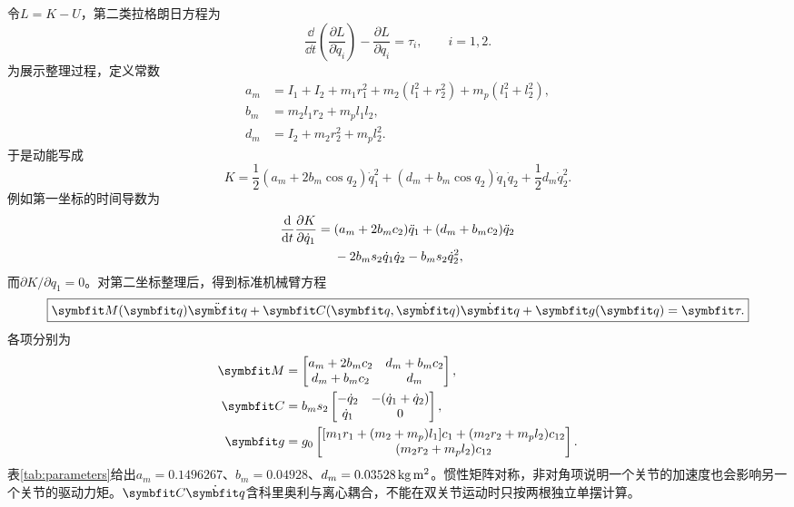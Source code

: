 令$L=K-U$，第二类拉格朗日方程\cite{lynch2017,asada2005}为
\begin{equation}
\frac{\dd}{\dd t}\left(\frac{\partial L}{\partial\dot q_i}\right)
-\frac{\partial L}{\partial q_i}=\tau_i,\qquad i=1,2.
\end{equation}
为展示整理过程，定义常数
\begin{align}
a_m&=I_1+I_2+m_1r_1^2+m_2(l_1^2+r_2^2)+m_p(l_1^2+l_2^2),\\
b_m&=m_2l_1r_2+m_pl_1l_2,\\
d_m&=I_2+m_2r_2^2+m_pl_2^2.
\end{align}
于是动能写成
\begin{equation}
K=\frac12(a_m+2b_m\cos q_2)\dot q_1^2
+(d_m+b_m\cos q_2)\dot q_1\dot q_2+\frac12d_m\dot q_2^2.
\end{equation}
例如第一坐标的时间导数为
\begin{align}
\frac{\mathrm d}{\mathrm d t}\frac{\partial K}{\partial\dot q_1}
={}&(a_m+2b_mc_2)\ddot q_1+(d_m+b_mc_2)\ddot q_2\notag\\
&-2b_ms_2\dot q_1\dot q_2-b_ms_2\dot q_2^2,
\end{align}
而$\partial K/\partial q_1=0$。对第二坐标整理后，得到标准机械臂方程
\begin{equation}
\boxed{\vect M(\vect q)\ddot{\vect q}+\vect C(\vect q,\dot{\vect q})\dot{\vect q}+\vect g(\vect q)=\vect\tau.}
\label{eq:serial_dyn}
\end{equation}
各项分别为
\begin{align}
\vect M&=\begin{bmatrix}a_m+2b_mc_2&d_m+b_mc_2\\d_m+b_mc_2&d_m\end{bmatrix},\label{eq:mass}\\
\vect C&=b_ms_2\begin{bmatrix}-\dot q_2&-(\dot q_1+\dot q_2)\\\dot q_1&0\end{bmatrix},\label{eq:coriolis}\\
\vect g&=g_0\begin{bmatrix}
[m_1r_1+(m_2+m_p)l_1]c_1+(m_2r_2+m_pl_2)c_{12}\\
(m_2r_2+m_pl_2)c_{12}
\end{bmatrix}.
\label{eq:gravity}
\end{align}
表\ref{tab:parameters}给出$a_m=0.1496267$、$b_m=0.04928$、$d_m=0.03528\,\mathrm{kg\,m^2}$。惯性矩阵对称，非对角项说明一个关节的加速度也会影响另一个关节的驱动力矩。$\vect C\dot{\vect q}$含科里奥利与离心耦合，不能在双关节运动时只按两根独立单摆计算。

